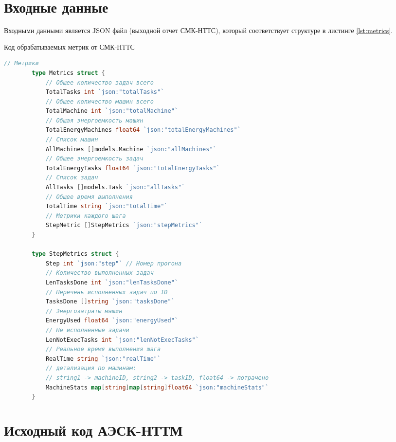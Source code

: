 \section{Входные данные}

Входными данными является JSON файл (выходной отчет СМК-НТТС), который соответствует структуре в листинге \ref{lst:metrics}.

\begin{ListingEnv}
	\caption{Код обрабатываемых метрик от СМК-НТТС}\label{lst:metrics}
	\begin{lstlisting}[language=Go]
		// Метрики
		type Metrics struct {
			// Общее количество задач всего
			TotalTasks int `json:"totalTasks"`
			// Общее количество машин всего
			TotalMachine int `json:"totalMachine"`
			// Общая энергоемкость машин
			TotalEnergyMachines float64 `json:"totalEnergyMachines"`
			// Список машин
			AllMachines []models.Machine `json:"allMachines"`
			// Общее энергоемкость задач
			TotalEnergyTasks float64 `json:"totalEnergyTasks"`
			// Список задач
			AllTasks []models.Task `json:"allTasks"`
			// Общее время выполнения
			TotalTime string `json:"totalTime"`
			// Метрики каждого шага
			StepMetric []StepMetrics `json:"stepMetrics"`
		}

		type StepMetrics struct {
			Step int `json:"step"` // Номер прогона
			// Количество выполненных задач
			LenTasksDone int `json:"lenTasksDone"`
			// Перечень исполненных задач по ID
			TasksDone []string `json:"tasksDone"`
			// Энергозатраты машин
			EnergyUsed float64 `json:"energyUsed"`
			// Не исполненные задачи
			LenNotExecTasks int `json:"lenNotExecTasks"`
			// Реальное время выполнения шага
			RealTime string `json:"realTime"`
			// детализация по машинам:
			// string1 -> machineID, string2 -> taskID, float64 -> потрачено
			MachineStats map[string]map[string]float64 `json:"machineStats"`
		}
	\end{lstlisting}
\end{ListingEnv}

\section{Исходный код АЭСК-НТТМ}

\begingroup

\endgroup


